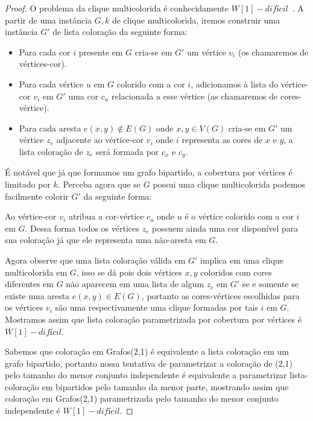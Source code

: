 \begin{proof}	
O problema da clique multicolorida é conhecidamente $W[1]-difícil$~\cite{fellows07}.
A partir de uma instância $G,k$ de clique multicolorida, iremos construir uma instância $G'$ de lista coloração da seguinte forma:
 
\begin{itemize}
\item Para cada cor $i$ presente em $G$ cria-se em $G'$ um vértice $v_i$ (os chamaremos de vértices-cor).

\item Para cada vértice $u$ em $G$ colorido com a cor $i$, adicionamos à lista do vértice-cor $v_i$ em $G'$ uma cor $c_u$ relacionada a esse vértice (as chamaremos de cores-vértice).

\item Para cada aresta $e(x,y) \notin E(G)$ onde $x,y \in V(G)$ cria-se em $G'$ um vértice $z_e$ adjacente ao vértice-cor $v_i$ onde $i$ representa as cores de $x$ e $y$, a lista coloração de $z_e$ será formada por $c_x$ e $c_y$.

\end{itemize}
	
É notável que já que formamos um grafo bipartido, a cobertura por vértices é limitado por $k$. Perceba agora que se $G$ possui uma clique multicolorida podemos facilmente colorir $G'$ da seguinte forma:
	
Ao vértice-cor $v_i$ atribua a cor-vértice $c_u$ onde $u$ é o vértice colorido com a cor $i$ em $G$. Dessa forma todos os vértices $z_e$ possuem ainda uma cor disponível para sua coloração já que ele representa uma não-aresta em $G$. 
	
Agora observe que uma lista coloração válida em $G'$ implica em uma clique multicolorida em $G$, isso se dá pois dois vértices $x,y$ coloridos com cores diferentes em $G$ não aparecem em uma lista de algum $z_e$ em $G'$ se e somente se existe uma aresta $e(x,y) \in E(G)$, portanto as cores-vértices escolhidas para os vértices $v_i$ são uma respectivamente uma clique formadas por tais $i$ em $G$. Mostramos assim que lista coloração parametrizada por cobertura por vértices é $W[1]-difícil$.
	
Sabemos que coloração em Grafos(2,1) é equivalente a lista coloração em um grafo bipartido, portanto nossa tentativa de parametrizar a coloração de (2,1) pelo tamanho do menor conjunto independente é equivalente a parametrizar lista-coloração em bipartidos pelo tamanho da menor parte, mostrando assim que coloração em Grafos(2,1) parametrizada pelo tamanho do menor conjunto independente é $W[1]-difícil$. 
\end{proof}

